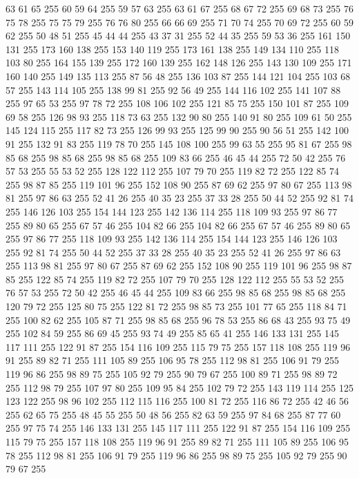 63 61 65 255 60 59 64 255 59 57 63 255 63 61 67 255 68 67 72 255 69 68 73 255 76 75 78 255 75 75 79 255 76 76 80 255 66 66 69 255 71 70 74 255 70 69 72 255 60 59 62 255 50 48 51 255 45 44 44 255 43 37 31 255 52 44 35 255 59 53 36 255 161 150 131 255 173 160 138 255 153 140 119 255 173 161 138 255 149 134 110 255 118 103 80 255 164 155 139 255 172 160 139 255 162 148 126 255 143 130 109 255 171 160 140 255 149 135 113 255 87 56 48 255 136 103 87 255 144 121 104 255 103 68 57 255 143 114 105 255 138 99 81 255 92 56 49 255 144 116 102 255 141 107 88 255 97 65 53 255 97 78 72 255 108 106 102 255 121 85 75 255 150 101 87 255 109 69 58 255 126 98 93 255 118 73 63 255 132 90 80 255 140 91 80 255 109 61 50 255 145 124 115 255 117 82 73 255 126 99 93 255 125 99 90 255 90 56 51 255 142 100 91 255 132 91 83 255 119 78 70 255 145 108 100 255 99 63 55 255 95 81 67 255 98 85 68 255 98 85 68 255 98 85 68 255
109 83 66 255 46 45 44 255 72 50 42 255 76 57 53 255 55 53 52 255 128 122 112 255 107 79 70 255 119 82 72 255 122 85 74 255 98 87 85 255 119 101 96 255 152 108 90 255 87 69 62 255 97 80 67 255 113 98 81 255 97 86 63 255 52 41 26 255 40 35 23 255 37 33 28 255 50 44 52 255 92 81 74 255 146 126 103 255 154 144 123 255 142 136 114 255 118 109 93 255 97 86 77 255 89 80 65 255 67 57 46 255 104 82 66 255 104 82 66 255 67 57 46 255 89 80 65 255 97 86 77 255 118 109 93 255 142 136 114 255 154 144 123 255 146 126 103 255 92 81 74 255 50 44 52 255 37 33 28 255 40 35 23 255 52 41 26 255 97 86 63 255 113 98 81 255 97 80 67 255 87 69 62 255 152 108 90 255 119 101 96 255 98 87 85 255 122 85 74 255 119 82 72 255 107 79 70 255 128 122 112 255 55 53 52 255 76 57 53 255 72 50 42 255 46 45 44 255 109 83 66 255 98 85 68 255 98 85 68 255 120 79 72 255 125 80 75 255 122 81 72 255 98 85 73 255
101 77 65 255 118 84 71 255 100 82 62 255 105 87 71 255 98 85 68 255 96 78 53 255 86 68 43 255 93 75 49 255 102 84 59 255 86 69 45 255 93 74 49 255 85 65 41 255 146 133 131 255 145 117 111 255 122 91 87 255 154 116 109 255 115 79 75 255 157 118 108 255 119 96 91 255 89 82 71 255 111 105 89 255 106 95 78 255 112 98 81 255 106 91 79 255 119 96 86 255 98 89 75 255 105 92 79 255 90 79 67 255 100 89 71 255 98 89 72 255 112 98 79 255 107 97 80 255 109 95 84 255 102 79 72 255 143 119 114 255 125 123 122 255 98 96 102 255 112 115 116 255 100 81 72 255 116 86 72 255 42 46 56 255 62 65 75 255 48 45 55 255 50 48 56 255 82 63 59 255 97 84 68 255 87 77 60 255 97 75 74 255 146 133 131 255 145 117 111 255 122 91 87 255 154 116 109 255 115 79 75 255 157 118 108 255 119 96 91 255 89 82 71 255 111 105 89 255 106 95 78 255 112 98 81 255 106 91 79 255 119 96 86 255 98 89 75 255 105 92 79 255 90 79 67 255
